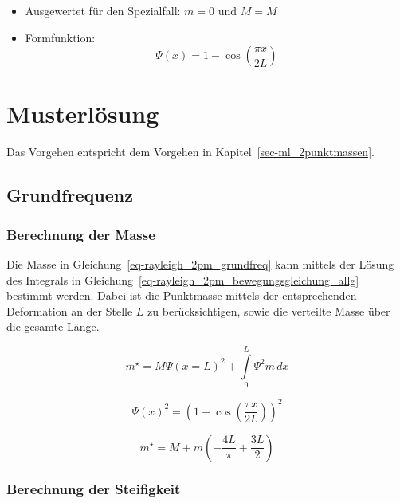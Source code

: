 \documentclass[
  letterpaper,
  DIV=11]{scrreprt}
\providecommand{\tightlist}{%
  \setlength{\itemsep}{0pt}\setlength{\parskip}{0pt}}\usepackage{longtable,booktabs,array}
\begin{document}
\begin{itemize}
\tightlist
\item
  Ausgewertet für den Spezialfall: \(m = 0 \text{ und } M = M\)
\item
  Formfunktion: \[ \Psi(x) = 1 - \cos(\frac{\pi x}{2L})\]
\end{itemize}

\newpage{}

\hypertarget{musterluxf6sung}{%
\section{Musterlösung}\label{musterluxf6sung}}

Das Vorgehen entspricht dem Vorgehen in
Kapitel~\ref{sec-ml_2punktmassen}.

\hypertarget{grundfrequenz-1}{%
\subsection{Grundfrequenz}\label{grundfrequenz-1}}

\hypertarget{berechnung-der-masse-1}{%
\subsubsection{Berechnung der Masse}\label{berechnung-der-masse-1}}

Die Masse in Gleichung~\ref{eq-rayleigh_2pm_grundfreq} kann mittels der
Lösung des Integrals in
Gleichung~\ref{eq-rayleigh_2pm_bewegungsgleichung_allg} bestimmt werden.
Dabei ist die Punktmasse mittels der entsprechenden Deformation an der
Stelle \(L\) zu berücksichtigen, sowie die verteilte Masse über die
gesamte Länge.

\begin{equation}m^{\star} = M \Psi(x=L)^{2} + \int\limits_{0}^{L} \Psi^{2} m\, dx\end{equation}

\begin{equation}\Psi(x)^{2} = \left(1 - \cos{\left(\frac{\pi x}{2 L} \right)}\right)^{2}\end{equation}

\begin{equation}m^{\star} = M + m \left(- \frac{4 L}{\pi} + \frac{3 L}{2}\right)\end{equation}

\hypertarget{berechnung-der-steifigkeit-1}{%
\subsubsection{Berechnung der
Steifigkeit}\label{berechnung-der-steifigkeit-1}}
\end{document}
